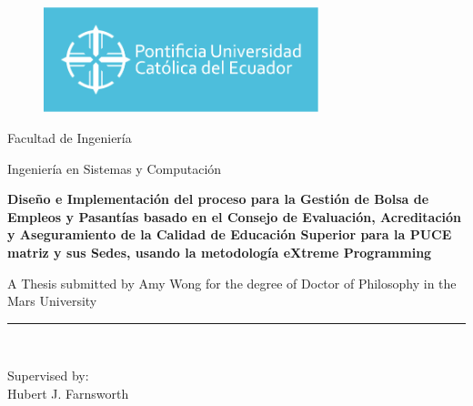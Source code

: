 \begin{titlepage}
		\begin{center}
			\vspace*{-1in}
			\begin{figure}[htb]
				\begin{center}
					\includegraphics[width=8cm]{./logos/puce.jpg}
				\end{center}
			\end{figure}
			Facultad de Ingeniería\\
			\vspace*{0.18in}
			\vspace*{0.6in}
			\begin{large}
				Ingeniería en Sistemas y Computación\\
			\end{large}
			\vspace*{0.2in}
			\begin{Large}
				\textbf{Diseño e Implementación del proceso para la Gestión de Bolsa de Empleos y Pasantías basado en el Consejo de Evaluación, Acreditación y Aseguramiento de la Calidad de Educación Superior para la PUCE matriz y sus Sedes, usando la metodología eXtreme Programming} \\
			\end{Large}
			\vspace*{0.3in}
			\begin{large}
				A Thesis submitted by Amy Wong for the degree of Doctor of Philosophy in the Mars University\\
			\end{large}
			\vspace*{0.3in}
			\rule{80mm}{0.1mm}\\
			\vspace*{0.1in}
			\begin{large}
				Supervised by: \\
				Hubert J. Farnsworth \\
			\end{large}
		\end{center}
\end{titlepage}